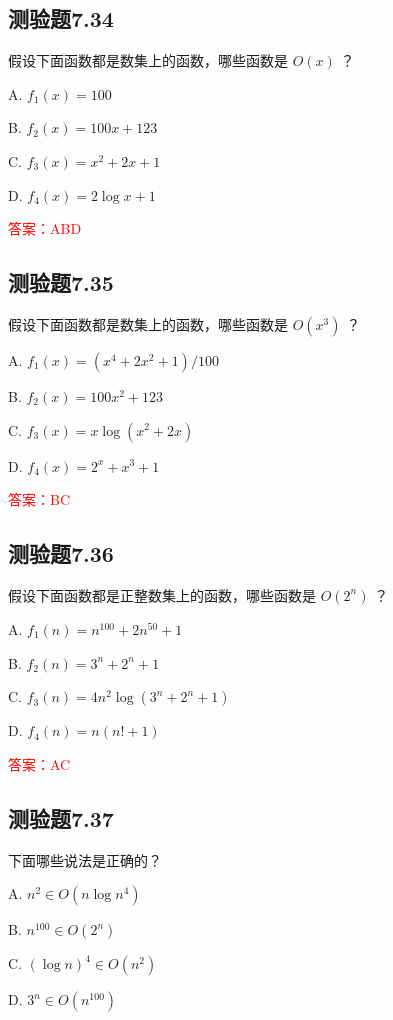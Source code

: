 \documentclass[UTF8, heading=true]{ctexart}
\begin{document}
\subsection{测验题7.34}

假设下面函数都是数集上的函数，哪些函数是 $O(x)$ ？

A. $f_1(x)=100$

B. $f_2(x)=100 x+123$

C. $f_3(x)=x^2+2 x+1$

D. $f_4(x)=2 \log x+1$

\textcolor{red}{答案：ABD}

\subsection{测验题7.35}

假设下面函数都是数集上的函数，哪些函数是 $O\left(x^3\right)$ ？

A. $f_1(x)=\left(x^4+2 x^2+1\right) / 100$

B. $f_2(x)=100 x^2+123$


C. $f_3(x)=x \log \left(x^2+2 x\right)$

D. $f_4(x)=2^x+x^3+1$

\textcolor{red}{答案：BC}

\subsection{测验题7.36}

假设下面函数都是正整数集上的函数，哪些函数是 $O\left(2^n\right)$ ？

A. $f_1(n)=n^{100}+2 n^{50}+1$

B. $f_2(n)=3^n+2^n+1$

C. $f_3(n)=4 n^2 \log \left(3^n+2^n+1\right)$

D. $f_4(n)=n(n!+1)$

\textcolor{red}{答案：AC}


\subsection{测验题7.37}

下面哪些说法是正确的？

A. $ n^2 \in O\left(n \log n^4\right)$

B. $ n^{100} \in O\left(2^n\right)$

C. $(\log n)^4 \in O\left(n^2\right)$

D. $ 3^n \in O\left(n^{100}\right)$
\end{document}
